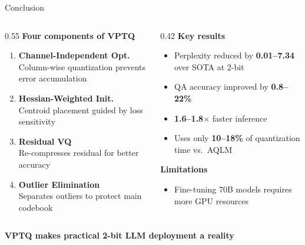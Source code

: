 \begin{frame}{Conclusion}
  \begin{columns}[T]
    \begin{column}{0.55\textwidth}
      \textbf{Four components of VPTQ}
      \begin{enumerate}
        \item \textbf{Channel-Independent Opt.}\\
          Column-wise quantization prevents error accumulation
        \vspace{0.3em}
        \item \textbf{Hessian-Weighted Init.}\\
          Centroid placement guided by loss sensitivity
        \vspace{0.3em}
        \item \textbf{Residual VQ}\\
          Re-compresses residual for better accuracy
        \vspace{0.3em}
        \item \textbf{Outlier Elimination}\\
          Separates outliers to protect main codebook
      \end{enumerate}
    \end{column}
    \begin{column}{0.42\textwidth}
      \textbf{Key results}
      \begin{itemize}
        \item Perplexity reduced by \textbf{0.01--7.34} over SOTA at 2-bit
        \item QA accuracy improved by \textbf{0.8--22\%}
        \item \textbf{1.6--1.8$\times$} faster inference
        \item Uses only \textbf{10--18\%} of quantization time vs.\ AQLM
      \end{itemize}
      \vspace{0.5em}
      \textbf{Limitations}
      \begin{itemize}
        \item Fine-tuning 70B models requires more GPU resources
      \end{itemize}
    \end{column}
  \end{columns}
  \vspace{0.5em}
  \begin{center}
    \textbf{VPTQ makes practical 2-bit LLM deployment a reality}
  \end{center}
\end{frame}
